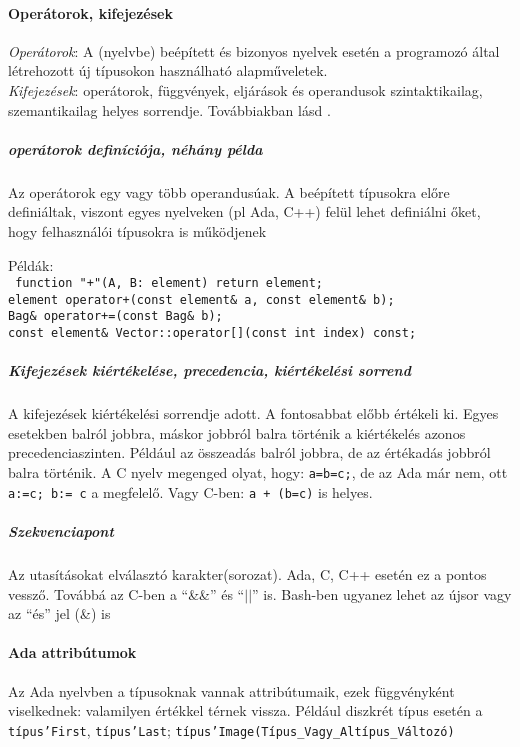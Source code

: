 \documentclass[fleqn,10pt,a4paper]{article}
\newcommand{\ut}[1]{\texttt{#1}}
\theoremstyle{magyar}
\begin{document}
  \paragraph{Operátorok, kifejezések}
  \emph{Operátorok}: A (nyelvbe) beépített és bizonyos nyelvek esetén a
  programozó által létrehozott új típusokon  használható
  alapműveletek.\\
  \emph{Kifejezések}: operátorok, függvények, eljárások és operandusok
  szintaktikailag, szemantikailag helyes sorrendje. Továbbiakban lásd
  \cite[1074.,~1078.~oldal]{c++book}.
  
  \subparagraph{operátorok definíciója, néhány példa}
  Az operátorok egy vagy több operandusúak. A beépített típusokra
  előre definiáltak, viszont egyes nyelveken (pl Ada, C++) felül lehet
  definiálni őket, hogy felhasználói típusokra is működjenek
  
  Példák:\\
  \ut{
    function "+"(A, B: element) return element;\\
    element operator+(const element\& a, const element\& b);\\
    Bag\& operator+=(const Bag\& b);\\
    const element\& Vector::operator[](const int index) const;}
  
  \subparagraph{Kifejezések kiértékelése, precedencia, kiértékelési
    sorrend}
  A kifejezések kiértékelési sorrendje adott. A fontosabbat előbb
  értékeli ki. Egyes esetekben balról jobbra, máskor jobbról balra
  történik a kiértékelés azonos precedenciaszinten. Például az
  összeadás balról jobbra, de az értékadás jobbról balra történik. A C
  nyelv megenged olyat, hogy: \ut{a=b=c;}, de az Ada már nem, ott
  \ut{a:=c; b:= c} a megfelelő. Vagy C-ben: \ut{a + (b=c)} is
  helyes.
  
  \subparagraph{Szekvenciapont}Az utasításokat elválasztó
  karakter(sorozat). Ada, C, C++ esetén ez a pontos vessző. Továbbá az
  C-ben a ``\&\&'' és ``$||$'' is. Bash-ben
  ugyanez lehet az újsor vagy az ``és'' jel (\&) is
  
  \paragraph{Ada attribútumok}
  Az Ada nyelvben a típusoknak vannak attribútumaik, ezek függvényként
  viselkednek: valamilyen értékkel térnek vissza. Például diszkrét
  típus esetén a \ut{típus'First}, \ut{típus'Last};
  \ut{típus'Image(Típus\_Vagy\_Altípus\_Változó)}
  
\end{document}
